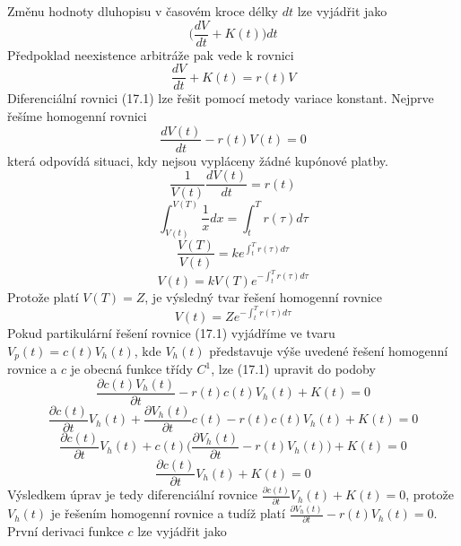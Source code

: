 \documentclass[a4paper]{book}
\begin{document}
Změnu hodnoty dluhopisu v časovém kroce délky $dt$ lze vyjádřit jako
\begin{equation*}
\Bigg(\frac{dV}{dt} + K(t) \Bigg)dt 
\end{equation*}
Předpoklad neexistence arbitráže pak vede k rovnici
\begin{equation}
\frac{dV}{dt} + K(t) = r(t)V
\end{equation}
Diferenciální rovnici (17.1) lze řešit pomocí metody variace konstant. Nejprve řešíme homogenní rovnici
\begin{equation*}
\frac{dV(t)}{dt} - r(t)V(t) = 0
\end{equation*}
která odpovídá situaci, kdy nejsou vypláceny žádné kupónové platby.
\begin{equation*}
\frac{1}{V(t)}\frac{dV(t)}{dt} = r(t)
\end{equation*}
\begin{equation*}
\int_{V(t)}^{V(T)}\frac{1}{x}dx = \int_{t}^{T}r(\tau) d \tau
\end{equation*}
\begin{equation*}
\frac{V(T)}{V(t)} = ke^{\int_t^T r(\tau) d\tau}
\end{equation*}
\begin{equation*}
V(t) = kV(T)e^{-\int_t^T r(\tau) d\tau}
\end{equation*}
Protože platí $V(T) = Z$, je výsledný tvar řešení homogenní rovnice
\begin{equation*}
V(t) = Ze^{-\int_t^T r(\tau) d\tau}
\end{equation*}
Pokud partikulární řešení rovnice (17.1) vyjádříme ve tvaru $V_p(t) = c(t)V_h(t)$, kde $V_h(t)$ představuje výše uvedené řešení homogenní rovnice a $c$ je obecná funkce třídy $C^1$, lze (17.1) upravit do podoby
\begin{equation*}
\frac{\partial c(t)V_h(t)}{\partial t} - r(t)c(t)V_h(t) + K(t)= 0
\end{equation*}
\begin{equation*}
\frac{\partial c(t)}{\partial t}V_h(t) + \frac{\partial V_h(t)}{\partial t}c(t) - r(t)c(t)V_h(t) + K(t) = 0
\end{equation*}
\begin{equation*}
\frac{\partial c(t)}{\partial t}V_h(t) + c(t)\Bigg(\frac{\partial V_h(t)}{\partial t} - r(t)V_h(t)\Bigg) + K(t) = 0
\end{equation*}
\begin{equation*}
\frac{\partial c(t)}{\partial t}V_h(t) + K(t) = 0
\end{equation*}
Výsledkem úprav je tedy diferenciální rovnice $\frac{\partial c(t)}{\partial t}V_h(t) + K(t) = 0$, protože $V_h(t)$ je řešením homogenní rovnice a tudíž platí $\frac{\partial V_h(t)}{\partial t} - r(t)V_h(t) = 0$. První derivaci funkce $c$ lze vyjádřit jako
\end{document}
